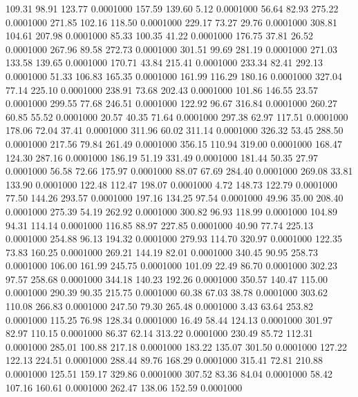  109.31   98.91  123.77   0.0001000
 157.59  139.60    5.12   0.0001000
  56.64   82.93  275.22   0.0001000
 271.85  102.16  118.50   0.0001000
 229.17   73.27   29.76   0.0001000
 308.81  104.61  207.98   0.0001000
  85.33  100.35   41.22   0.0001000
 176.75   37.81   26.52   0.0001000
 267.96   89.58  272.73   0.0001000
 301.51   99.69  281.19   0.0001000
 271.03  133.58  139.65   0.0001000
 170.71   43.84  215.41   0.0001000
 233.34   82.41  292.13   0.0001000
  51.33  106.83  165.35   0.0001000
 161.99  116.29  180.16   0.0001000
 327.04   77.14  225.10   0.0001000
 238.91   73.68  202.43   0.0001000
 101.86  146.55   23.57   0.0001000
 299.55   77.68  246.51   0.0001000
 122.92   96.67  316.84   0.0001000
 260.27   60.85   55.52   0.0001000
  20.57   40.35   71.64   0.0001000
 297.38   62.97  117.51   0.0001000
 178.06   72.04   37.41   0.0001000
 311.96   60.02  311.14   0.0001000
 326.32   53.45  288.50   0.0001000
 217.56   79.84  261.49   0.0001000
 356.15  110.94  319.00   0.0001000
 168.47  124.30  287.16   0.0001000
 186.19   51.19  331.49   0.0001000
 181.44   50.35   27.97   0.0001000
  56.58   72.66  175.97   0.0001000
  88.07   67.69  284.40   0.0001000
 269.08   33.81  133.90   0.0001000
 122.48  112.47  198.07   0.0001000
   4.72  148.73  122.79   0.0001000
  77.50  144.26  293.57   0.0001000
 197.16  134.25   97.54   0.0001000
  49.96   35.00  208.40   0.0001000
 275.39   54.19  262.92   0.0001000
 300.82   96.93  118.99   0.0001000
 104.89   94.31  114.14   0.0001000
 116.85   88.97  227.85   0.0001000
  40.90   77.74  225.13   0.0001000
 254.88   96.13  194.32   0.0001000
 279.93  114.70  320.97   0.0001000
 122.35   73.83  160.25   0.0001000
 269.21  144.19   82.01   0.0001000
 340.45   90.95  258.73   0.0001000
 106.00  161.99  245.75   0.0001000
 101.09   22.49   86.70   0.0001000
 302.23   97.57  258.68   0.0001000
 344.18  140.23  192.26   0.0001000
 350.57  140.47  115.00   0.0001000
 290.39   90.35  215.75   0.0001000
  60.38   67.03   38.78   0.0001000
 303.62  110.08  266.83   0.0001000
 247.50   79.30  265.48   0.0001000
   3.43   63.64  253.82   0.0001000
 115.25   76.98  128.34   0.0001000
  16.49   58.44  124.13   0.0001000
 301.97   82.97  110.15   0.0001000
  86.37   62.14  313.22   0.0001000
 230.49   85.72  112.31   0.0001000
 285.01  100.88  217.18   0.0001000
 183.22  135.07  301.50   0.0001000
 127.22  122.13  224.51   0.0001000
 288.44   89.76  168.29   0.0001000
 315.41   72.81  210.88   0.0001000
 125.51  159.17  329.86   0.0001000
 307.52   83.36   84.04   0.0001000
  58.42  107.16  160.61   0.0001000
 262.47  138.06  152.59   0.0001000
